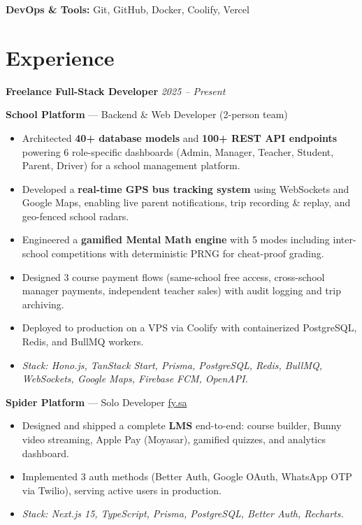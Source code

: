 \documentclass[10pt, letterpaper]{article}
\newenvironment{highlights}{
    \begin{itemize}[
        topsep=0.08cm,
        parsep=0.08cm,
        partopsep=0pt,
        itemsep=0pt,
        leftmargin=10pt
    ]
}{
    \end{itemize}
}
\begin{document}
\textbf{DevOps \& Tools:} Git, GitHub, Docker, Coolify, Vercel

\section{Experience}

\textbf{Freelance Full-Stack Developer} \hfill \textit{2025 -- Present}

\vspace{0.08cm}

\textbf{School Platform} — Backend \& Web Developer (2-person team)
\begin{highlights}
    \item Architected \textbf{40+ database models} and \textbf{100+ REST API endpoints} powering 6 role-specific dashboards (Admin, Manager, Teacher, Student, Parent, Driver) for a school management platform.
    \item Developed a \textbf{real-time GPS bus tracking system} using WebSockets and Google Maps, enabling live parent notifications, trip recording \& replay, and geo-fenced school radars.
    \item Engineered a \textbf{gamified Mental Math engine} with 5 modes including inter-school competitions with deterministic PRNG for cheat-proof grading.
    \item Designed 3 course payment flows (same-school free access, cross-school manager payments, independent teacher sales) with audit logging and trip archiving.
    \item Deployed to production on a VPS via Coolify with containerized PostgreSQL, Redis, and BullMQ workers.
    \item \textit{Stack: Hono.js, TanStack Start, Prisma, PostgreSQL, Redis, BullMQ, WebSockets, Google Maps, Firebase FCM, OpenAPI.}
\end{highlights}

\vspace{0.15cm}

\textbf{Spider Platform} — Solo Developer \hfill \href{https://fy.sa}{fy.sa}
\begin{highlights}
    \item Designed and shipped a complete \textbf{LMS} end-to-end: course builder, Bunny video streaming, Apple Pay (Moyasar), gamified quizzes, and analytics dashboard.
    \item Implemented 3 auth methods (Better Auth, Google OAuth, WhatsApp OTP via Twilio), serving active users in production.
    \item \textit{Stack: Next.js 15, TypeScript, Prisma, PostgreSQL, Better Auth, Recharts.}
\end{highlights}
\end{document}
